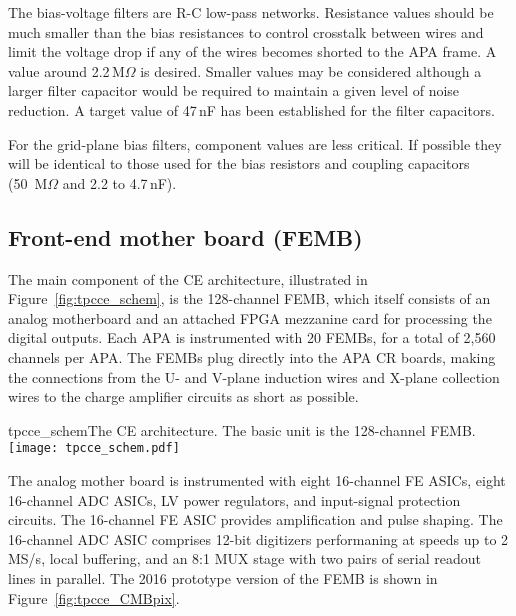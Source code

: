 The bias-voltage filters are R-C low-pass networks.
Resistance values should be much smaller than the bias resistances to control crosstalk between wires
and limit the voltage drop if any of the wires becomes shorted to the APA frame.
A value around 2.2\,M$\Omega$ is desired.
Smaller values may be considered although a larger filter capacitor would be required to maintain a given level of noise reduction.
A target value of 47\,nF has been established for the filter capacitors.

For the grid-plane bias filters, component values are less critical.
If possible they will be identical to those used for the bias resistors and coupling capacitors
(50~M$\Omega$ and 2.2 to 4.7\,nF).


\subsection{Front-end mother board (FEMB)}
\label{subsec:fe_arch}

The main component of the CE architecture, illustrated in Figure~\ref{fig:tpcce_schem}, is the 
128-channel FEMB, which itself consists of an analog motherboard and an attached FPGA 
mezzanine card for processing the digital outputs.
Each APA is instrumented with 20 FEMBs, for a total of 2,560 channels per APA.
The FEMBs plug directly into the APA CR boards, making the connections from the U- and V-plane induction wires and 
X-plane collection wires to the charge amplifier circuits as short as possible.

\begin{cdrfigure}{tpcce_schem}{The CE architecture. The basic unit is the 128-channel FEMB.}
\texttt{[image: tpcce\_schem.pdf]}
\end{cdrfigure}

The analog mother board is instrumented with eight 16-channel FE ASICs,
eight 16-channel ADC ASICs, LV power regulators, and input-signal protection circuits.
The 16-channel FE ASIC provides amplification and pulse shaping.
The 16-channel ADC ASIC comprises 12-bit digitizers performaning at speeds up to 2 MS/s, local buffering,
and an 8:1 MUX stage with two pairs of serial readout lines in parallel. The 2016 prototype version of
the FEMB is shown in Figure~\ref{fig:tpcce_CMBpix}.

